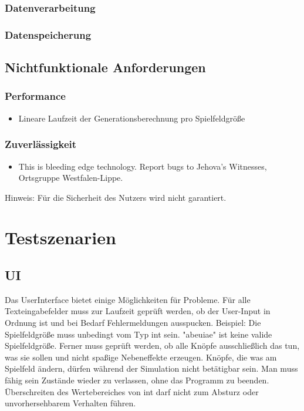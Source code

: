 \documentclass[11pt,a4paper]{article}
\begin{document}
    \pagebreak
    
\subsubsection{}



\subsubsection{Datenverarbeitung}
\subsubsection{Datenspeicherung}
\subsection{Nichtfunktionale Anforderungen}
\subsubsection{Performance}
\begin{itemize}
    \item Lineare Laufzeit der Generationsberechnung pro Spielfeldgröße
\end{itemize}
\subsubsection{Zuverlässigkeit}
\begin{itemize}
    \item This is bleeding edge technology. Report bugs to Jehova's Witnesses, Ortsgruppe Westfalen-Lippe.
\end{itemize}

Hinweis: Für die Sicherheit des Nutzers wird nicht garantiert.
\pagebreak

\section{Testszenarien}
\subsection{UI}
Das UserInterface bietet einige Möglichkeiten für Probleme. Für alle Texteingabefelder muss zur Laufzeit geprüft werden, ob der User-Input in Ordnung ist und bei Bedarf Fehlermeldungen ausspucken. Beispiel: Die Spielfeldgröße muss unbedingt vom Typ int sein. "abeuiae" ist keine valide Spielfeldgröße.
Ferner muss geprüft werden, ob alle Knöpfe ausschließlich das tun, was sie sollen und nicht spaßige Nebeneffekte erzeugen.
Knöpfe, die was am Spielfeld ändern, dürfen während der Simulation nicht betätigbar sein. Man muss fähig sein Zustände wieder zu verlassen, ohne das Programm zu beenden. Überschreiten des Wertebereiches von int darf nicht zum Absturz oder unvorhersehbarem Verhalten führen. 
\end{document}
